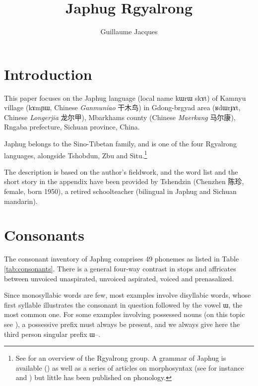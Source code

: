 \documentclass[oldfontcommands,oneside,a4paper,11pt]{article}
\newcommand{\ipa}[1]{{\phon #1}} %
\newcommand{\zh}[1]{{\cn #1}}
\begin{document}
 

\title{Japhug Rgyalrong}
\author{Guillaume Jacques}
\maketitle
\linenumbers
 \section{Introduction}
 This paper focuses on the Japhug language (local name \ipa{kɯrɯ skɤt}) of Kamnyu village (\ipa{kɤmɲɯ}, Chinese \textit{Ganmuniao} \zh{干木鸟}) in Gdong-brgyad area (\ipa{ʁdɯrɟɤt}, Chinese  \textit{Longerjia} \zh{龙尔甲}), Mbarkhams county (Chinese \textit{Maerkang} \zh{马尔康}), Rngaba prefecture, Sichuan province, China.
 
 Japhug belongs to the Sino-Tibetan family, and is one of the four Rgyalrong languages, alongside Tshobdun, Zbu and Situ.\footnote{See  \citet{jackson00sidaba} for an overview of the Rgyalrong group. A grammar of Japhug is available (\citealt{jacques08}) as well as a series of articles on morphosyntax (see for instance  \citet{jacques13harmonization} and
 \citet{jacques14antipassive}) but little has been published on phonology. } 
 
The description is based on the author’s fieldwork, and the word list and the short story in the appendix have been provided by Tshendzin (Chenzhen \zh{陈珍}, female, born 1950), a retired schoolteacher (bilingual in Japhug and Sichuan mandarin).

 

 
 \section{Consonants}
 The consonant inventory of Japhug comprises 49 phonemes as listed in Table \ref{tab:consonants}. There is a general four-way contrast in stops and affricates between unvoiced unaspirated, unvoiced aspirated, voiced and prenasalized.
 
Since monosyllabic words are few,  most examples involve disyllabic words, whose first syllable illustrates the consonant in question followed by the vowel \ipa{ɯ}, the most common one. For some examples involving possessed nouns (on this topic see \citealt[6]{jacques14antipassive}), a possessive prefix must always be present, and we always give here the third person singular prefix  \ipa{ɯ--}.
 
\end{document}
